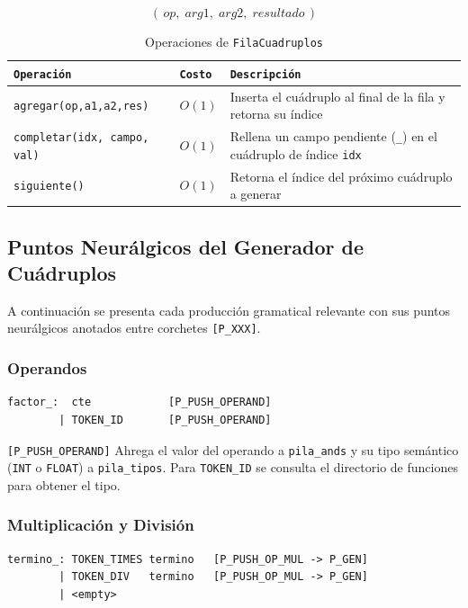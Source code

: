 \documentclass[12pt, letterpaper]{article}
\theoremstyle{definition}
\begin{document}
\[
    (\,\textit{op},\; \textit{arg1},\; \textit{arg2},\; \textit{resultado}\,)
\]

\begin{table}[H]
\centering
\caption{Operaciones de \texttt{FilaCuadruplos}}
\begin{tabular}{|p{4.5cm}|p{1.5cm}|p{6cm}|}
    \hline
    \texttt{Operación} & \texttt{Costo} & \texttt{Descripción} \\ \hline
    \texttt{agregar(op,a1,a2,res)} & $O(1)$ & Inserta el cuádruplo al final de la fila y retorna su índice \\ \hline
    \texttt{completar(idx, campo, val)} & $O(1)$ & Rellena un campo pendiente (\texttt{\_}) en el cuádruplo de índice \texttt{idx}  \\ \hline
    \texttt{siguiente()} & $O(1)$ & Retorna el índice del próximo cuádruplo a generar \\ \hline
\end{tabular}
\end{table}

\subsection{Puntos Neurálgicos del Generador de Cuádruplos}

A continuación se presenta cada producción gramatical relevante con sus puntos neurálgicos anotados entre corchetes \texttt{[P\_XXX]}.
\subsubsection*{Operandos}

\begin{verbatim}
factor_:  cte            [P_PUSH_OPERAND]
        | TOKEN_ID       [P_PUSH_OPERAND]
\end{verbatim}

\texttt{[P\_PUSH\_OPERAND]} Ahrega el valor del operando a \texttt{pila\_ands} y su tipo semántico (\texttt{INT} o \texttt{FLOAT}) a \texttt{pila\_tipos}.  Para \texttt{TOKEN\_ID} se consulta el directorio de funciones para obtener el tipo.

\subsubsection*{Multiplicación y División}

\begin{verbatim}
termino_: TOKEN_TIMES termino   [P_PUSH_OP_MUL -> P_GEN]
        | TOKEN_DIV   termino   [P_PUSH_OP_MUL -> P_GEN]
        | <empty>
\end{verbatim}
\end{document}
